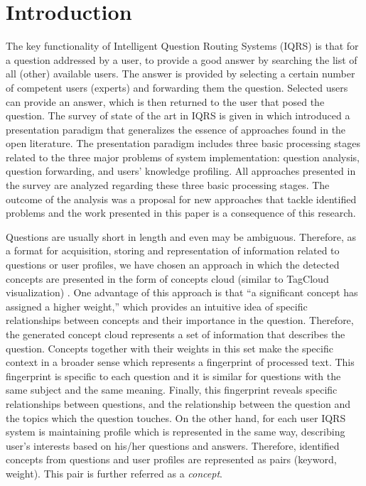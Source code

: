 \documentclass[conference]{IEEEtran}
\begin{document}
\vspace{-0.3cm}
\section{Introduction}
The key functionality of Intelligent Question Routing Systems (IQRS) is that for a question addressed by a user, to provide a good answer by searching the list of all (other) available users. The answer is provided by selecting a certain number of competent users (experts) and forwarding them the question. Selected users can provide an answer, which is then returned to the user that posed the question. The survey of state of the art in IQRS is given in \cite{bib:survey2013} which introduced a presentation paradigm that generalizes the essence of approaches found in the open literature. The presentation paradigm includes three basic processing stages related to the three major problems of system implementation: question analysis, question forwarding, and users' knowledge profiling. All approaches presented in the survey are analyzed regarding these three basic processing stages. The outcome of the analysis was a proposal for new approaches that tackle identified problems and the work presented in this paper is a consequence of this research.

Questions are usually short in length and even may be ambiguous. Therefore, as a format for acquisition, storing and representation of information related to questions or user profiles, we have chosen an approach in which the detected concepts are presented in the form of concepts cloud (similar to TagCloud visualization) \cite{bib:TAG07, bib:TAG08}. One advantage of this approach is that ``a significant concept has assigned a higher weight,'' which provides an intuitive idea of specific relationships between concepts and their importance in the question. Therefore, the generated concept cloud represents a set of information that describes the question. Concepts together with their weights in this set make the specific context in a broader sense which represents a fingerprint of processed text. This fingerprint is specific to each question and it is similar for questions with the same subject and the same meaning. Finally, this fingerprint reveals specific relationships between questions, and the relationship between the question and the topics which the question touches. On the other hand, for each user IQRS system is maintaining profile which is represented in the same way, describing user’s interests based on his/her questions and answers. Therefore, identified concepts from questions and user profiles are represented as pairs (keyword, weight). This pair is further referred as a {\it concept}.
\end{document}

